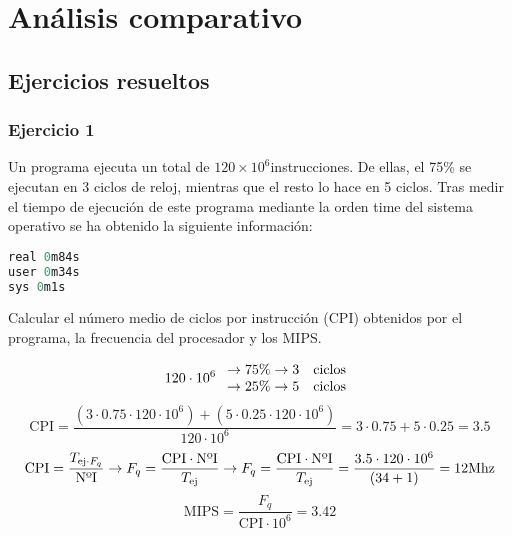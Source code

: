 \chapter{Análisis comparativo}
\section{Ejercicios resueltos}
\subsection{Ejercicio 1}
\noindent
Un programa ejecuta un total de $120\times 10^6$instrucciones. De ellas, el 75\% se ejecutan en 3 ciclos de reloj, mientras que el resto lo hace en 5 ciclos. Tras medir el tiempo de ejecución de este programa mediante la orden time del sistema operativo se ha obtenido la siguiente información:
\begin{lstlisting}[language=C]
real 0m84s
user 0m34s
sys 0m1s
\end{lstlisting} 
Calcular el número medio de ciclos por instrucción (CPI) obtenidos por el programa, la frecuencia del procesador y los MIPS.
\begin{tcolorbox}[colback=white,colframe=cyan!50!black,fonttitle=\bfseries]
\[120\cdot 10^6\left.\begin{array}{ll}
\rightarrow 75\%\rightarrow 3\quad\text{ciclos}\\
\rightarrow 25\%\rightarrow 5\quad\text{ciclos}
\end{array}\right.
\]
\[
\text{CPI}=\dfrac{(3\cdot0.75\cdot 120\cdot 10^6)+(5\cdot 0.25\cdot 120\cdot 10^6)}{120\cdot 10^6}=3\cdot 0.75+5\cdot 0.25=3.5
\]
\[
\text{CPI}=\dfrac{T_{\text{ej}\cdot F_q}}{\text{NºI}}\rightarrow F_q=\dfrac{\text{CPI}\cdot\text{NºI}}{T_{\text{ej}}}\rightarrow F_q=\dfrac{\text{CPI}\cdot\text{NºI}}{T_{\text{ej}}}=\dfrac{3.5\cdot 120\cdot 10^6}{(34+1)}=12\text{Mhz}
\]
\[
\text{MIPS}=\dfrac{F_q}{\text{CPI}\cdot 10^6}=3.42
\]
\end{tcolorbox}
